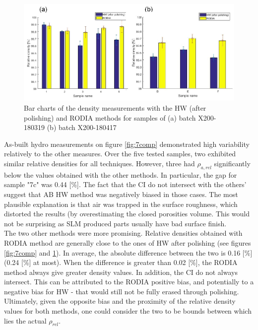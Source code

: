 \begin{figure}[ht]
	\centering
	\centerline{\includegraphics[scale=0.64]{Images/2comp}}
	\decoRule
	\caption[Bar charts of the density measurements with the HW (after polishing) and RODIA methods for samples of (a) batch X200-180319 (b) batch X200-180417]{Bar charts of the density measurements with the HW (after polishing) and RODIA methods for samples of (a) batch X200-180319 (b) batch X200-180417}
	\label{fig:2comp}
\end{figure}

As-built hydro measurements on figure \ref{fig:7comp} demonstrated high variability relatively to the other measures. Over the five tested samples, two exhibited similar relative densities for all techniques. However, three had $\rho_{a,rel}$ significantly below the values obtained with the other methods. In particular, the gap for sample "7c" was 0.44 [\%]. The fact that the CI do not intersect with the others' suggest that AB HW method was negatively biased in those cases. The most plausible explanation is that air was trapped in the surface roughness, which distorted the results (by overestimating the closed porosities volume. This would not be surprising as SLM produced parts usually have bad surface finish.\\ %

The two other methods were more promising. Relative densities obtained with RODIA method are generally close to the ones of HW after polishing (see figures \ref{fig:7comp} and \ref{fig:2comp}). In average, the absolute difference between the two is 0.16 [\%] (0.24 [\%] at most).  When the difference is greater than 0.02 [\%], the RODIA method always give greater density values. In addition, the CI do not always intersect. This can be attributed to the RODIA positive bias, and potentially to a negative bias for HW - that would still not be fully erased through polishing. Ultimately, given the opposite bias and the proximity of the relative density values for both methods, one could consider the two to be bounds between which lies the actual $\rho_{rel}$.\\


